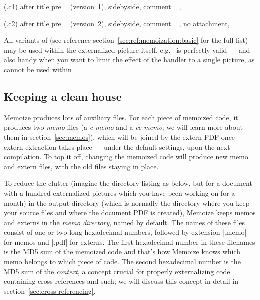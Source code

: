 \documentclass[a4paper,11pt]{article}
\begin{document}
(.c1){
  after title pre={\ (version~1)},
  sidebyside,
  comment={\centering
  },
}

(.c2){
  after title pre={\ (version~2)},
  sidebyside,
  comment={\centering
  },
  no attachment,
}

All variants of  (see reference
section~\ref{sec:ref:memoization:basic} for the full list) may be used within
the externalized picture itself, e.g.\  is perfectly
valid --- and also handy when you want to limit the effect of the handler to a
single picture, as  cannot be used within
.



\subsection{Keeping a clean house}
\label{sec:tut:memodir}

Memoize produces lots of auxiliary files.  For each piece of memoized code, it
produces two \emph{memo} files (a \emph{c-memo} and a \emph{cc-memo}; we will
learn more about them in section~\ref{sec:memos}), which will be joined by the
extern PDF once extern extraction takes place --- under the default settings,
upon the next compilation.  To top it off, changing the memoized code will
produce new memo and extern files, with the old files staying in place.

To reduce the clutter (imagine the directory listing as below, but for a
document with a hundred externalized pictures which you have been working on
for a month) in the output directory (which is normally the directory where you
keep your source files and where the document PDF is created), Memoize keeps
memos and externs in the \emph{memo directory}, named  by default.  The names of these files consist of one or two
long hexadecimal numbers, followed by extension |.memo| for memos and |.pdf|
for externs.  The first hexadecimal number in these filenames is the MD5 sum of
the memoized code and that's how Memoize knows which memo belongs to which
piece of code.  The second hexadecimal number is the MD5 sum of the
\emph{context}, a concept crucial for properly externalizing code containing
cross-references and such; we will discuss this concept in detail in
section~\ref{sec:cross-referencing}.
\end{document}

